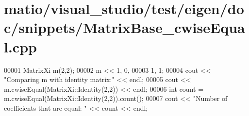 \hypertarget{matio_2visual__studio_2test_2eigen_2doc_2snippets_2_matrix_base__cwise_equal_8cpp_source}{}\section{matio/visual\+\_\+studio/test/eigen/doc/snippets/\+Matrix\+Base\+\_\+cwise\+Equal.cpp}
\label{matio_2visual__studio_2test_2eigen_2doc_2snippets_2_matrix_base__cwise_equal_8cpp_source}

\begin{DoxyCode}
00001 MatrixXi m(2,2);
00002 m << 1, 0,
00003      1, 1;
00004 cout << \textcolor{stringliteral}{"Comparing m with identity matrix:"} << endl;
00005 cout << m.cwiseEqual(MatrixXi::Identity(2,2)) << endl;
00006 \textcolor{keywordtype}{int} count = m.cwiseEqual(MatrixXi::Identity(2,2)).count();
00007 cout << \textcolor{stringliteral}{"Number of coefficients that are equal: "} << count << endl;
\end{DoxyCode}

